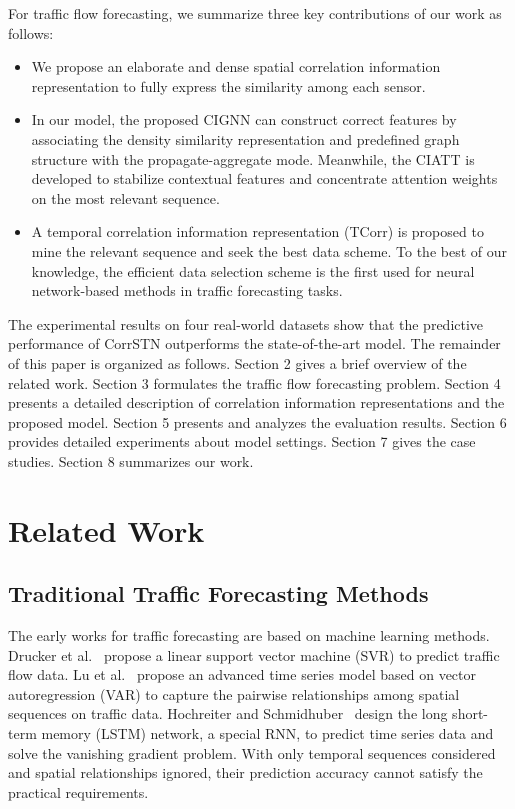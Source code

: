 \documentclass[sn-mathphys,iicol]{sn-jnl}
\theoremstyle{thmstyleone}\newtheorem{theorem}{Theorem}\newtheorem{proposition}[theorem]{Proposition}
\theoremstyle{thmstyletwo}\newtheorem{example}{Example}\newtheorem{remark}{Remark}
\theoremstyle{thmstylethree}\newtheorem{definition}{Definition}
\begin{document}
For traffic flow forecasting, we summarize three key contributions of our work as follows:
\begin{itemize}
    \item We propose an elaborate and dense spatial correlation information representation to fully express the similarity among each sensor.
    \item In our model, the proposed CIGNN can construct correct features by associating the density similarity representation and predefined graph structure with the propagate-aggregate mode. Meanwhile, the CIATT is developed to stabilize contextual features and concentrate attention weights on the most relevant sequence.
    \item A temporal correlation information representation (TCorr) is proposed to mine the relevant sequence and seek the best data scheme. To the best of our knowledge, the efficient data selection scheme is the first used for neural network-based methods in traffic forecasting tasks.
\end{itemize}

The experimental results on four real-world datasets show that the predictive performance of CorrSTN outperforms the state-of-the-art model.
{\color{black}The remainder of this paper is organized as follows. Section 2 gives a brief overview of the related work. Section 3 formulates the traffic flow forecasting problem. Section 4 presents a detailed description of correlation information representations and the proposed model. Section 5 presents and analyzes the evaluation results. Section 6 provides detailed experiments about model settings. Section 7 gives the case studies. Section 8 summarizes our work.}

\section{Related Work}
\subsection{Traditional Traffic Forecasting Methods}
The early works for traffic forecasting are based on machine learning methods. 
Drucker et al.~\cite{Drucker:1997} propose a linear support vector machine (SVR) to predict traffic flow data. 
Lu et al.~\cite{Lu:2003br} propose an advanced time series model based on vector autoregression (VAR) to capture the pairwise relationships among spatial sequences on traffic data. 
Hochreiter and Schmidhuber~\cite{Hochreiter:1997} design the long short-term memory (LSTM) network, a special RNN, to predict time series data and solve the vanishing gradient problem.
With only temporal sequences considered and spatial relationships ignored, their prediction accuracy cannot satisfy the practical requirements.
\end{document}
